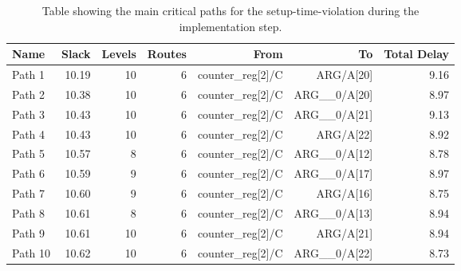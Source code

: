 \begin{table}[H]
    \centering
    \small
    \captionsetup{skip=10pt} 
    \begin{tabular}{lrrrrrr}
        \hline
        Name    & Slack & Levels & Routes  & From           & To               & Total Delay \\
        \hline
        Path 1  & 10.19 &      10 &       6 & counter\_reg[2]/C & ARG/A[20]        & 9.16       \\
        Path 2  & 10.38 &      10 &       6 & counter\_reg[2]/C & ARG\_\_0/A[20]   & 8.97       \\
        Path 3  & 10.43 &      10 &       6 & counter\_reg[2]/C & ARG\_\_0/A[21]   & 9.13       \\
        Path 4  & 10.43 &      10 &       6 & counter\_reg[2]/C & ARG/A[22]        & 8.92       \\
        Path 5  & 10.57 &       8 &       6 & counter\_reg[2]/C & ARG\_\_0/A[12]   & 8.78       \\
        Path 6  & 10.59 &       9 &       6 & counter\_reg[2]/C & ARG\_\_0/A[17]   & 8.97       \\
        Path 7  & 10.60 &       9 &       6 & counter\_reg[2]/C & ARG/A[16]        & 8.75       \\
        Path 8  & 10.61 &       8 &       6 & counter\_reg[2]/C & ARG\_\_0/A[13]   & 8.94       \\
        Path 9  & 10.61 &      10 &       6 & counter\_reg[2]/C & ARG/A[21]        & 8.94       \\
        Path 10 & 10.62 &      10 &       6 & counter\_reg[2]/C & ARG\_\_0/A[22]   & 8.73       \\
        \hline
    \end{tabular}
    \caption{Table showing the main critical paths for the setup-time-violation during the implementation step.}
    \label{tab:setup_implementation}
\end{table}


